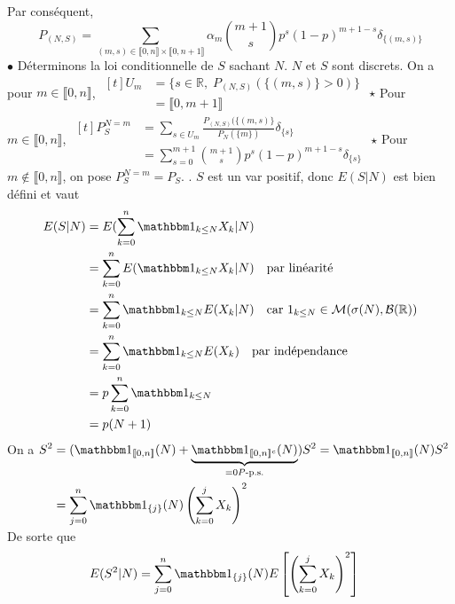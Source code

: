 \documentclass{report}
\begin{document}
Par conséquent, $$ P_{(N,S)} = \sum_{(m,s)\in\llbracket 0,n \rrbracket \times \llbracket 0,n+1 \rrbracket} \alpha_m \binom{m+1}{s}p^s(1-p)^{m+1-s} \delta_{\{(m,s)\}} $$
$\bullet$ Déterminons la loi conditionnelle de $S$ sachant $N$. $N$ et $S$ sont discrets.\newline
On a pour $m\in \llbracket 0,n \rrbracket$,  $\begin{aligned}[t]
U_m &=\{ s\in \mathbb R,\; P_{(N,S)}(\{(m,s)\} >0 )\}\\
&= \llbracket 0,m+1 \rrbracket
\end{aligned}$\newline
$\star$ Pour $m\in \llbracket 0,n \rrbracket$, $\begin{aligned}[t]P_S^{N=m} &=\sum_{s\in U_m} \frac{P_{(N,S)}(\{(m,s)\}}{P_N(\{m\})}\delta_{\{s\}} \\
&=\sum_{s=0}^{m+1}\binom{m+1}{s}p^s(1-p)^{m+1-s} \delta_{\{s\}} 
\end{aligned}$ \newline
$\star$ Pour $m\notin \llbracket 0,n \rrbracket$, on pose $P_S^{N=m}=P_S$. \newline
{}. $S$ est un var positif, donc $E(S|N)$ est bien défini et vaut $$\begin{aligned} 
E(S|N) &= E(\sum_{k=0}^n \mathbbm 1_{k\leq N} X_k | N) \\
&= \sum_{k=0}^n E(\mathbbm 1_{k\leq N} X_k | N) \quad \text{par linéarité} \\
&= \sum_{k=0}^n \mathbbm 1_{k\leq N} E(X_k|N) \quad \text{car } 1_{k\leq N}\in \mathcal M(\sigma(N),\mathcal B(\mathbb R)) \\
&= \sum_{k=0}^n \mathbbm 1_{k\leq N} E(X_k) \quad \text{par indépendance} \\
&= p\sum_{k=0}^n \mathbbm 1_{k\leq N}  \\
&= p(N+1)
\end{aligned}$$
On a $\begin{aligned}[t] S^2&=(\mathbbm 1_{\llbracket 0,n \rrbracket}(N) + \underbrace{\mathbbm 1_{\llbracket 0,n \rrbracket^c}(N)}_{=0 P\text{-p.s.}})S^2 = \mathbbm 1_{\llbracket 0,n \rrbracket}(N) S^2 \\
&= \sum_{j=0}^n \mathbbm 1_{\{j\}}(N) \left(\sum_{k=0}^j X_k \right)^2 \end{aligned}$ \newline
De sorte que $$\begin{aligned}
E(S^2|N) &= \sum_{j=0}^n \mathbbm 1_{\{j\}}(N) E\left[\left(\sum_{k=0}^j X_k \right)^2 \right]
\end{aligned}$$
\end{document}
